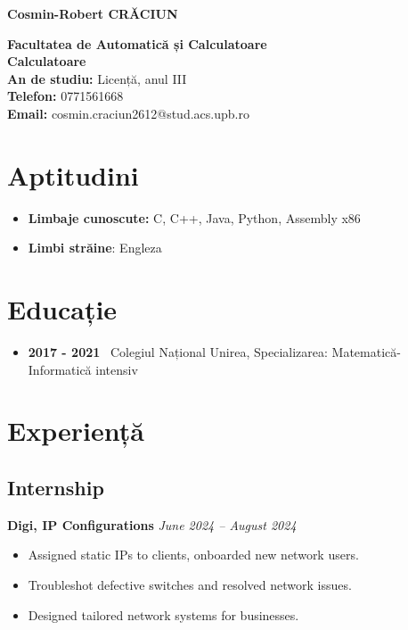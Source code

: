 \documentclass[a4paper,10pt]{article}
\begin{document}
\begin{center}
    \textbf{\Huge Cosmin-Robert CRĂCIUN}
\end{center}

\noindent
\textbf{Facultatea de Automatică și Calculatoare} \\
\textbf{Calculatoare} \\
\textbf{An de studiu:} Licență, anul III \\
\textbf{Telefon:} 0771561668 \\
\textbf{Email:} cosmin.craciun2612@stud.acs.upb.ro \\

\section*{Aptitudini}
\begin{itemize}[leftmargin=*]
    \item \textbf{Limbaje cunoscute:} C, C++, Java, Python, Assembly x86
    \item \textbf{Limbi străine}: Engleza
\end{itemize}

\section*{Educație}
\begin{itemize}[leftmargin=*]
    \item \textbf{2017 - 2021} \
    Colegiul Național Unirea, Specializarea: Matematică-Informatică intensiv
\end{itemize}

\section*{Experiență}
\subsection*{Internship}
\textbf{Digi, IP Configurations} \hfill \textit{June 2024 – August 2024} \\
\begin{itemize}[leftmargin=*]
    \item Assigned static IPs to clients, onboarded new network users.
    \item Troubleshot defective switches and resolved network issues.
    \item Designed tailored network systems for businesses.
\end{itemize}
\end{document}
